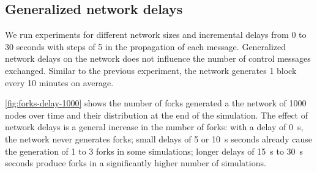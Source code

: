 \subsection{Generalized network delays}
We run experiments for different network sizes and incremental delays from \num{0} to \num{30} seconds with steps of \num{5} in the propagation of each message.
Generalized network delays on the network does not influence the number of control messages exchanged.
Similar to the previous experiment, the network generates \num{1} block every \num{10} minutes on average.

\medskip
\cref{fig:forks-delay-1000} shows the number of forks generated a the network of \num{1000} nodes over time and their distribution at the end of the simulation.
The effect of network delays is a general increase in the number of forks:
with a delay of \SI{0}{\second}, the network never generates forks;
small delays of \num{5} or \SI{10}{\second} seconds already cause the generation of \num{1} to \num{3} forks in some simulations;
longer delays of \SI{15}{\second} to \SI{30}{\second} seconds produce forks in a significantly higher number of simulations.

